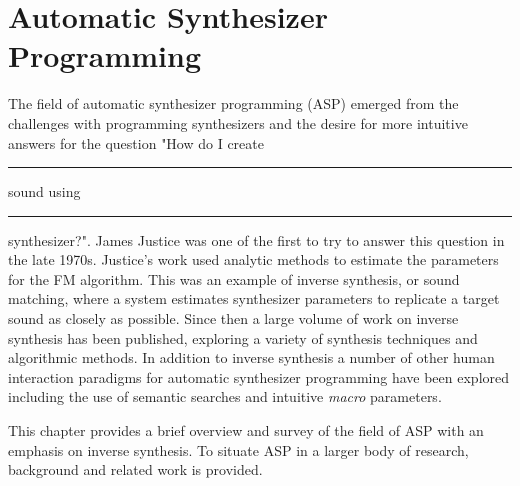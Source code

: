 \chapter{Automatic Synthesizer Programming}
\label{chapter:asp-background}
The field of automatic synthesizer programming (ASP) emerged from the challenges with programming synthesizers and the desire for more intuitive answers for the question "How do I create \rule{1cm}{0.15mm} sound using \rule{1cm}{0.15mm} synthesizer?". James Justice \cite{justice1979analytic} was one of the first to try to answer this question in the late 1970s. Justice's work used analytic methods to estimate the parameters for the FM algorithm. This was an example of inverse synthesis, or sound matching, where a system estimates synthesizer parameters to replicate a target sound as closely as possible. Since then a large volume of work on inverse synthesis has been published, exploring a variety of synthesis techniques and algorithmic methods. In addition to inverse synthesis a number of other human interaction paradigms for automatic synthesizer programming have been explored including the use of semantic searches and intuitive \textit{macro} parameters. 

This chapter provides a brief overview and survey of the field of ASP with an emphasis on inverse synthesis. To situate ASP in a larger body of research, background and related work is provided.





